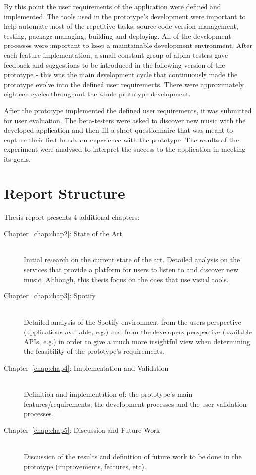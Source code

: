   By this point the user requirements of the application were defined and implemented.
  The tools used in the prototype's development were important to help automate most of the repetitive tasks: source code version management, testing, package managing, building and deploying.
  All of the development processes were important to keep a maintainable development environment.
  After each feature implementation, a small constant group of alpha-testers gave feedback and suggestions to be introduced in the following version of the prototype - this was the main development cycle that continuously made the prototype evolve into the defined user requirements.
  There were approximately eighteen cycles throughout the whole prototype development.

  After the prototype implemented the defined user requirements, it was submitted for user evaluation.
  The beta-testers were asked to discover new music with the developed application and then fill a short questionnaire that was meant to capture their first hands-on experience with the prototype.
  The results of the experiment were analysed to interpret the success to the application in meeting its goals.

\section{Report Structure}
\label{sec:structure}
  
  Thesis report presents 4 additional chapters:

  \begin{description}
    \item[Chapter~\ref{chap:chap2}: State of the Art] \hfill \\
      Initial research on the current state of the art.
      Detailed analysis on the services that provide a platform for users to listen to and discover new music.
      Although, this thesis focus on the ones that use visual tools.
    \item[Chapter~\ref{chap:chap3}: Spotify] \hfill \\
      Detailed analysis of the Spotify environment from the users perspective (applications available, e.g.) and from the developers perspective (available APIs, e.g.) in order to give a much more insightful view when determining the feasibility of the prototype's requirements.
    \item[Chapter~\ref{chap:chap4}: Implementation and Validation] \hfill \\
      Definition and implementation of: the prototype's main features/requirements; the development processes and the user validation processes.
    \item[Chapter~\ref{chap:chap5}: Discussion and Future Work] \hfill \\
      Discussion of the results and definition of future work to be done in the prototype (improvements, features, etc).
  \end{description}
